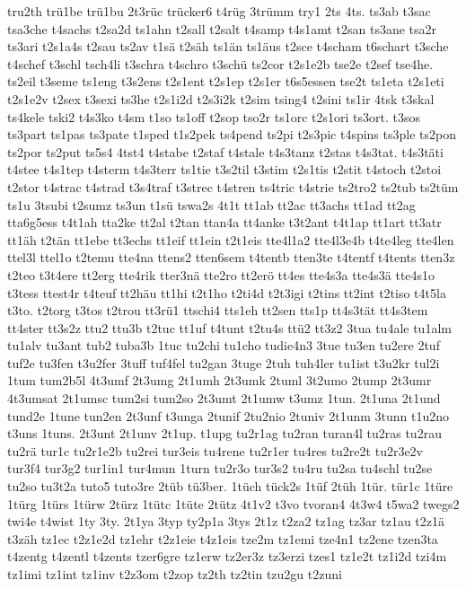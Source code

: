 {tru2th
trü1be
trü1bu
2t3rüc
trücker6
t4rüg
3trümm
try1
2ts
4ts.
ts3ab
t3sac
tsa3che
t4sachs
t2sa2d
ts1ahn
t2sall
t2salt
t4samp
t4s1amt
t2san
ts3ane
tsa2r
ts3ari
t2s1a4s
t2sau
ts2av
t1sä
t2säh
ts1än
ts1äus
t2sce
t4scham
t6schart
t3sche
t4schef
t3schl
tsch4li
t3schra
t4schro
t3schü
ts2cor
t2s1e2b
tse2e
t2sef
tse4he.
ts2eil
t3seme
ts1eng
t3s2ens
t2s1ent
t2s1ep
t2s1er
t6s5essen
tse2t
ts1eta
t2s1eti
t2s1e2v
t2sex
t3sexi
ts3he
t2s1i2d
t2s3i2k
t2sim
tsing4
t2sini
ts1ir
4tsk
t3skal
ts4kele
tski2
t4s3ko
t4sm
t1so
ts1off
t2sop
tso2r
ts1orc
t2s1ori
ts3ort.
t3sos
ts3part
ts1pas
ts3pate
t1sped
t1s2pek
ts4pend
ts2pi
t2s3pic
t4spins
ts3ple
ts2pon
ts2por
ts2put
ts5s4
4tst4
t4stabe
t2staf
t4stale
t4s3tanz
t2stas
t4s3tat.
t4s3täti
t4stee
t4s1tep
t4sterm
t4s3terr
ts1tie
t3s2til
t3stim
t2s1tis
t2stit
t4stoch
t2stoi
t2stor
t4strac
t4strad
t3s4traf
t3strec
t4stren
ts4tric
t4strie
ts2tro2
ts2tub
ts2tüm
ts1u
3tsubi
t2sumz
ts3un
t1sü
tswa2s
4t1t
tt1ab
tt2ac
tt3achs
tt1ad
tt2ag
tta6g5ess
t4t1ah
tta2ke
tt2al
t2tan
ttan4a
tt4anke
t3t2ant
t4t1ap
tt1art
tt3atr
tt1äh
t2tän
tt1ebe
tt3echs
tt1eif
tt1ein
t2t1eis
tte4l1a2
tte4l3e4b
t4te4leg
tte4len
ttel3l
ttel1o
t2temu
tte4na
ttens2
tten6sem
t4tentb
tten3te
t4tentf
t4tents
tten3z
t2teo
t3t4ere
tt2erg
tte4rik
tter3nä
tte2ro
tt2erö
tt4es
tte4s3a
tte4s3ä
tte4s1o
t3tess
ttest4r
t4teuf
tt2häu
tt1hi
t2t1ho
t2ti4d
t2t3igi
t2tins
tt2int
t2tiso
t4t5la
t3to.
t2torg
t3tos
t2trou
tt3rü1
ttschi4
tts1eh
tt2sen
tts1p
tt4s3tät
tt4s3tem
tt4ster
tt3s2z
ttu2
ttu3b
t2tuc
tt1uf
t4tunt
t2tu4s
ttü2
tt3z2
3tua
tu4ale
tu1alm
tu1alv
tu3ant
tub2
tuba3b
1tuc
tu2chi
tu1cho
tudie4n3
3tue
tu3en
tu2ere
2tuf
tuf2e
tu3fen
t3u2fer
3tuff
tuf4fel
tu2gan
3tuge
2tuh
tuh4ler
tu1ist
t3u2kr
tul2i
1tum
tum2b5l
4t3umf
2t3umg
2t1umh
2t3umk
2tuml
3t2umo
2tump
2t3umr
4t3umsat
2t1umsc
tum2si
tum2so
2t3umt
2t1umw
t3umz
1tun.
2t1una
2t1und
tund2e
1tune
tun2en
2t3unf
t3unga
2tunif
2tu2nio
2tuniv
2t1unm
3tunn
t1u2no
t3uns
1tuns.
2t3unt
2t1unv
2t1up.
t1upg
tu2r1ag
tu2ran
turan4l
tu2ras
tu2rau
tu2rä
tur1c
tu2r1e2b
tu2rei
tur3eis
tu4rene
tu2r1er
tu4res
tu2re2t
tu2r3e2v
tur3f4
tur3g2
tur1in1
tur4mun
1turn
tu2r3o
tur3s2
tu4ru
tu2sa
tu4schl
tu2se
tu2so
tu3t2a
tuto5
tuto3re
2tüb
tü3ber.
1tüch
tück2s
1tüf
2tüh
1tür.
tür1c
1türe
1türg
1türs
1türw
2türz
1tütc
1tüte
2tütz
4t1v2
t3vo
tvoran4
4t3w4
t5wa2
twegs2
twi4e
t4wist
1ty
3ty.
2t1ya
3typ
ty2p1a
3tys
2t1z
t2za2
tz1ag
tz3ar
tz1au
t2z1ä
t3zäh
tz1ec
t2z1e2d
tz1ehr
t2z1eie
t4z1eis
tze2m
tz1emi
tze4n1
tz2ene
tzen3ta
t4zentg
t4zentl
t4zents
tzer6gre
tz1erw
tz2er3z
tz3erzi
tzes1
tz1e2t
tz1i2d
tzi4m
tz1imi
tz1int
tz1inv
t2z3om
t2zop
tz2th
tz2tin
tzu2gu
t2zuni
}

